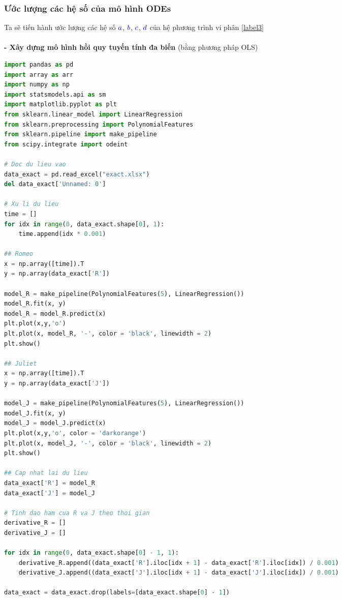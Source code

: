 \documentclass[a4paper]{article}
\begin{document}
    \subsubsection{Ước lượng các hệ số của mô hình ODEs}
    Ta sẽ tiến hành ước lượng các hệ số $\textcolor{blue}{a}$, $\textcolor{blue}{b}$, $\textcolor{blue}{c}$, $\textcolor{blue}{d}$ của hệ phương trình vi phân \eqref{label3}\\\\
    {\bfseries - Xây dựng mô hình hồi quy tuyến tính đa biến} (bằng phương pháp OLS)\\
    
\begin{lstlisting}[language=Python]
import pandas as pd
import array as arr
import numpy as np
import statsmodels.api as sm
import matplotlib.pyplot as plt
from sklearn.linear_model import LinearRegression
from sklearn.preprocessing import PolynomialFeatures
from sklearn.pipeline import make_pipeline
from scipy.integrate import odeint

# Doc du lieu vao
data_exact = pd.read_excel("exact.xlsx")
del data_exact['Unnamed: 0']

# Xu li du lieu
time = []
for idx in range(0, data_exact.shape[0], 1):
    time.append(idx * 0.001)
    
## Romeo
x = np.array([time]).T
y = np.array(data_exact['R'])

model_R = make_pipeline(PolynomialFeatures(5), LinearRegression())
model_R.fit(x, y)
model_R = model_R.predict(x)
plt.plot(x,y,'o')
plt.plot(x, model_R, '-', color = 'black', linewidth = 2)
plt.show()

## Juliet
x = np.array([time]).T
y = np.array(data_exact['J'])

model_J = make_pipeline(PolynomialFeatures(5), LinearRegression())
model_J.fit(x, y)
model_J = model_J.predict(x)
plt.plot(x,y,'o', color = 'darkorange')
plt.plot(x, model_J, '-', color = 'black', linewidth = 2)
plt.show()

## Cap nhat lai du lieu
data_exact['R'] = model_R
data_exact['J'] = model_J

# Tinh dao ham cua R va J theo thoi gian
derivative_R = []
derivative_J = []

for idx in range(0, data_exact.shape[0] - 1, 1):
    derivative_R.append((data_exact['R'].iloc[idx + 1] - data_exact['R'].iloc[idx]) / 0.001)
    derivative_J.append((data_exact['J'].iloc[idx + 1] - data_exact['J'].iloc[idx]) / 0.001)

data_exact = data_exact.drop(labels=[data_exact.shape[0] - 1])


\end{lstlisting}
\end{document}
